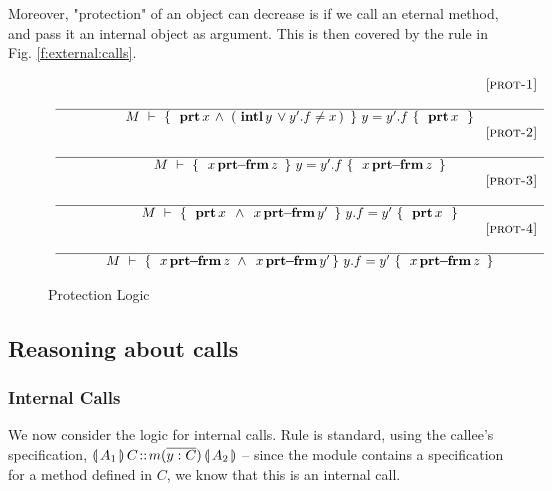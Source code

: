 {Moreover, "protection" of an object can decrease is if we call an eternal method, and pass it an internal object as argument. This is then covered by the rule in Fig. \ref{f:external:calls}.

{
\begin{figure}[hbt]
$
\begin{array}{c}
	{\inferruleSD{\hspace{5.3cm} [\sc{prot-1}]}
	{ }
	{\hproves{M} 
						{\  \inside{x}  \wedge\ (\, \internal {y} \vee y'.f \neq x\, ) \ }
						{\ y =y'.f\ }
						{\  \inside{x}\ }
	}
	}
	\\
{\inferruleSD{\hspace{5.3cm} [\sc{prot-2}]}
	{ }
	{\hproves{M} 
						{\ \protectedFrom{x}{z} \ }
						{\ y =y'.f\ }
						{\ \protectedFrom{x}{z}\ }
	}
}
\\
{\inferruleSD{\hspace{5.3cm} [\sc{prot-3}]}
	{ }
	{\hproves{M} 
						{\  \inside{x}\ \wedge \   \protectedFrom{x}{y'} \ }
						{\ y.f=y'\ }
						{\  \inside{x}\ }
	}
}	
\\
{\inferruleSD{\hspace{5.3cm} [\sc{prot-4}]}
	{ }
	{\hproves{M} 
						{\ \protectedFrom{x}{z} \ \wedge \   \protectedFrom{x}{y'} }
						{\ y.f=y'\ }
						{\ \protectedFrom{x}{z} \ }
	}
}	 
%
%
%
%
\end{array}
$
\caption{Protection Logic}
\label{f:protection}
\end{figure}
}

  
\subsection{Reasoning about calls}
\subsubsection{Internal Calls}
We now consider the logic for internal calls.
Rule {} is standard, using the callee's specification, ${ {\llparenthesis}\, A_1\, {\rrparenthesis}\, C\!::\!m(\overline{y:C})\, {\llparenthesis}\, A_2\, {\rrparenthesis} }$ -- since the module contains a specification for a method defined in $C$, we know that this is an internal call.

}
